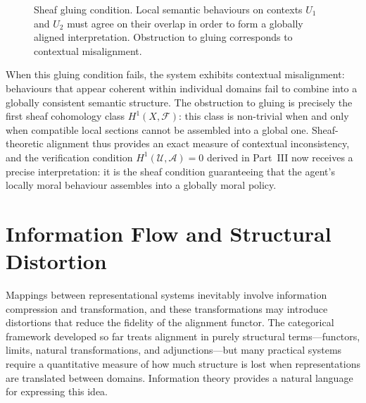 \documentclass[12pt]{article}
\theoremstyle{definition}
\begin{document}
\begin{figure}[h]
\centering
{}
\caption{Sheaf gluing condition. Local semantic behaviours on contexts $U_1$ and
$U_2$ must agree on their overlap in order to form a globally aligned
interpretation. Obstruction to gluing corresponds to contextual misalignment.}
\end{figure}

When this gluing condition fails, the system exhibits contextual misalignment:
behaviours that appear coherent within individual domains fail to combine into a
globally consistent semantic structure. The obstruction to gluing is precisely
the first sheaf cohomology class $H^1(X, \mathcal{F})$: this class is non-trivial
when and only when compatible local sections cannot be assembled into a global
one. Sheaf-theoretic alignment thus provides an exact measure of contextual
inconsistency, and the verification condition $H^1(\mathcal{U}, \mathcal{A}) = 0$
derived in Part~III now receives a precise interpretation: it is the sheaf
condition guaranteeing that the agent's locally moral behaviour assembles into a
globally moral policy.

\section{Information Flow and Structural Distortion}

Mappings between representational systems inevitably involve information
compression and transformation, and these transformations may introduce
distortions that reduce the fidelity of the alignment functor. The categorical
framework developed so far treats alignment in purely structural terms---functors,
limits, natural transformations, and adjunctions---but many practical systems
require a quantitative measure of how much structure is lost when representations
are translated between domains. Information theory provides a natural language
for expressing this idea.
\end{document}
